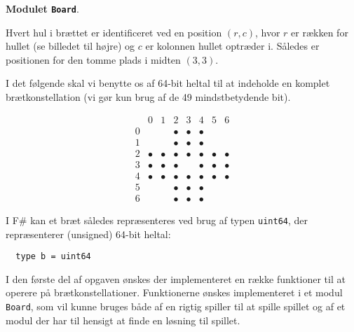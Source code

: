 \textbf{Modulet \texttt{Board}}.

\begin{minipage}{0.65\linewidth}
Hvert hul i brættet er identificeret ved en position $(r,c)$, hvor $r$ er rækken for hullet (se billedet til højre) og $c$ er kolonnen hullet optræder i. Således er positionen for den tomme plads i midten $(3,3)$.

I det følgende skal vi benytte os af 64-bit heltal til at indeholde en komplet brætkonstellation (vi gør kun brug af de 49 mindstbetydende bit).
\end{minipage}\hfill
\begin{minipage}[b]{0.3\linewidth}
    \[
      \begin{array}{r|c|c|c|c|c|c|c}
        & 0 & 1 & 2 & 3 & 4 & 5 & 6 \\ \hline
        0 & & & \bullet & \bullet & \bullet & & \\ \hline
        1 & & & \bullet & \bullet & \bullet & & \\ \hline
        2 & \bullet & \bullet & \bullet & \bullet & \bullet & \bullet & \bullet \\ \hline
        3 & \bullet & \bullet & \bullet &  & \bullet & \bullet & \bullet \\ \hline
        4 & \bullet & \bullet & \bullet & \bullet & \bullet & \bullet & \bullet \\ \hline
        5 & & & \bullet & \bullet & \bullet & & \\ \hline
        6 & & & \bullet & \bullet & \bullet & &
      \end{array}
    \]
\end{minipage}

I F\# kan et bræt således repræsenteres ved brug af
typen \lstinline{uint64}, der repræsenterer (unsigned) 64-bit heltal:
\begin{lstlisting}
  type b = uint64
\end{lstlisting}

I den første del af opgaven ønskes der implementeret en række funktioner til at operere på brætkonstellationer. Funktionerne ønskes implementeret i et modul \lstinline{Board}, som vil kunne bruges både af en rigtig spiller til at spille spillet og af et modul der har til hensigt at finde en løsning til spillet.

